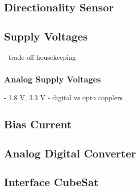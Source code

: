 \subsection{Directionality Sensor}
\label{sec:directionality Sensor}


\subsection{Supply Voltages}
\label{sec:power_supplies}
- trade-off housekeeping

\subsubsection{Analog Supply Voltages}
\label{sec:analog_supply}
- 1.8 V, 3.3 V
- digital vs opto copplers

\subsection{Bias Current}
\label{sec:bias_current}


\subsection{Analog Digital Converter}
\label{sec:adc}


\subsection{Interface CubeSat}
\label{sec:interface_cubesat}
